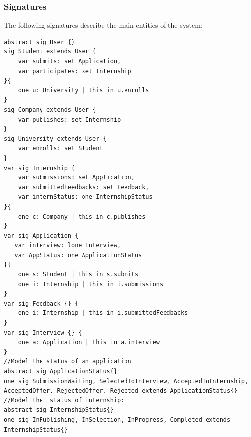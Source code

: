 \subsubsection{Signatures}
The following signatures describe the main entities of the system:
\begin{lstlisting}
abstract sig User {}
sig Student extends User {
    var submits: set Application,
    var participates: set Internship
}{
    one u: University | this in u.enrolls
}
sig Company extends User {
    var publishes: set Internship
}
sig University extends User {
    var enrolls: set Student
}
var sig Internship {
    var submissions: set Application,
    var submittedFeedbacks: set Feedback,
    var internStatus: one InternshipStatus
}{
    one c: Company | this in c.publishes
}
var sig Application {
   var interview: lone Interview,
   var AppStatus: one ApplicationStatus
}{
    one s: Student | this in s.submits
    one i: Internship | this in i.submissions
}
var sig Feedback {} {
    one i: Internship | this in i.submittedFeedbacks
} 
var sig Interview {} {
    one a: Application | this in a.interview
}
//Model the status of an application
abstract sig ApplicationStatus{}
one sig SubmissionWaiting, SelectedToInterview, AcceptedToInternship, 
AcceptedOffer, RejectedOffer, Rejected extends ApplicationStatus{}
//Model the  status of internship:
abstract sig InternshipStatus{}
one sig InPublishing, InSelection, InProgress, Completed extends InternshipStatus{}
\end{lstlisting}

